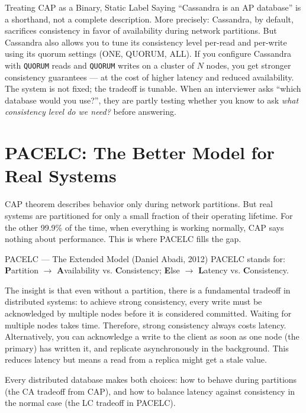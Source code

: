 \documentclass[11pt,a4paper]{article}
\begin{document}
\begin{trapbox}{Treating CAP as a Binary, Static Label}
Saying ``Cassandra is an AP database'' is a shorthand, not a complete description. More precisely: Cassandra, by default, sacrifices consistency in favor of availability during network partitions. But Cassandra also allows you to tune its consistency level per-read and per-write using its quorum settings (ONE, QUORUM, ALL). If you configure Cassandra with \texttt{QUORUM} reads and \texttt{QUORUM} writes on a cluster of $N$ nodes, you get stronger consistency guarantees --- at the cost of higher latency and reduced availability. The system is not fixed; the tradeoff is tunable. When an interviewer asks ``which database would you use?'', they are partly testing whether you know to ask \textit{what consistency level do we need?} before answering.
\end{trapbox}

\section{PACELC: The Better Model for Real Systems}

CAP theorem describes behavior only during network partitions. But real systems are partitioned for only a small fraction of their operating lifetime. For the other 99.9\% of the time, when everything is working normally, CAP says nothing about performance. This is where PACELC fills the gap.

\begin{termbox}{PACELC --- The Extended Model (Daniel Abadi, 2012)}
PACELC stands for: \textbf{P}artition $\rightarrow$ \textbf{A}vailability vs. \textbf{C}onsistency; \textbf{E}lse $\rightarrow$ \textbf{L}atency vs. \textbf{C}onsistency.

The insight is that even without a partition, there is a fundamental tradeoff in distributed systems: to achieve strong consistency, every write must be acknowledged by multiple nodes before it is considered committed. Waiting for multiple nodes takes time. Therefore, strong consistency always costs latency. Alternatively, you can acknowledge a write to the client as soon as one node (the primary) has written it, and replicate asynchronously in the background. This reduces latency but means a read from a replica might get a stale value.

Every distributed database makes both choices: how to behave during partitions (the CA tradeoff from CAP), and how to balance latency against consistency in the normal case (the LC tradeoff in PACELC).
\end{termbox}
\end{document}
